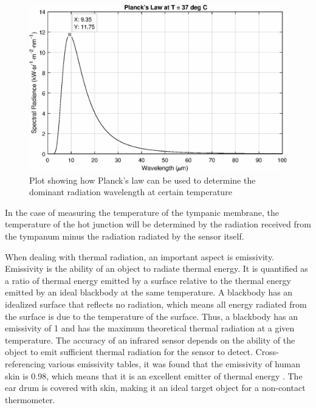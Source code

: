 \medskip

\begin{figure}[h]
   \centering
   \includegraphics[scale=0.6]{figs/PlancksLaw}
   \caption{Plot showing how Planck's law can be used to determine the dominant radiation wavelength at certain temperature}
   \label{fig:PlancksLaw}
\end{figure}

In the case of measuring the temperature of the tympanic membrane, the temperature of the hot junction will be determined by the radiation received from the tympanum minus the radiation radiated by the sensor itself.

\medskip

When dealing with thermal radiation, an important aspect is emissivity. Emissivity is the ability of an object to radiate thermal energy. It is quantified as a ratio of thermal energy emitted by a surface relative to the thermal energy emitted by an ideal blackbody at the same temperature. A blackbody has an idealized surface that reflects no radiation, which means all energy radiated from the surface is due to the temperature of the surface. Thus, a blackbody has an emissivity of 1 and has the maximum theoretical thermal radiation at a given temperature. The accuracy of an infrared sensor depends on the ability of the object to emit sufficient thermal radiation for the sensor to detect. Cross-referencing various emissivity tables, it was found that the emissivity of human skin is 0.98, which means that it is an excellent emitter of thermal energy \citep{stumme2003emissivity} \citep{EmissivityThermoWorks} \citep{EmissivityOptotherm}. The ear drum is covered with skin, making it an ideal target object for a non-contact thermometer.

